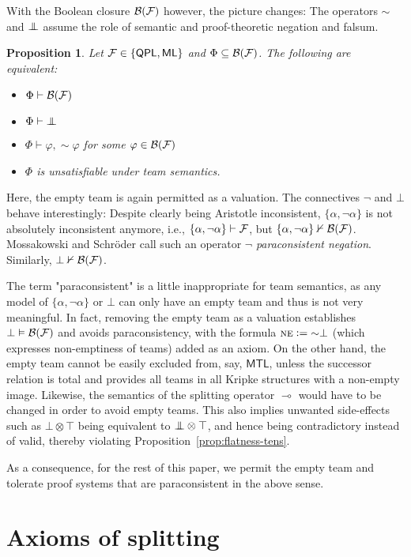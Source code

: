 \documentclass[a4paper,english,fleqn,11pt,final]{scrartcl}
\makeatletter
\newcommand{\ie}{i.e.\@\xspace}
\newcommand{\negg}{{\sim}}
\newcommand{\logic}[1]{\ensuremath{\mathsf{#1}}\xspace}
\newcommand{\QPL}{\logic{QPL}}
\newcommand{\ML}{\logic{ML}}
\newcommand{\MTL}{\logic{MTL}}
\newcommand{\NE}{\text{\textsc{ne}}}
\newcommand{\calB}{\protect\ensuremath{\mathcal{B}}}
\newcommand{\calF}{\protect\ensuremath{\mathcal{F}}}
\providecommand{\dfn}{\mathrel{\mathop:}=}
\newcommand{\limp}{\multimap}
\newcommand{\tens}{\otimes}
\newcommand{\falsum}{\mathrlap{\,\bot}\bot\,}
\theoremstyle{plain}
\newtheorem{proposition}[theorem]{Proposition}
\theoremstyle{definition}
\makeatother
\begin{document}
With the Boolean closure $\calB(\calF)$ however, the picture changes:
The operators $\negg$ and $\falsum$ assume the role of semantic and proof-theoretic negation and falsum.
\begin{proposition}
Let $\calF \in \{\QPL,\ML \}$ and $\Phi \subseteq \calB(\calF)$.
The following are equivalent:
\begin{itemize}
\item $\Phi \vdash \calB(\calF)$
\item $\Phi \vdash \falsum$
\item $\Phi \vdash \varphi,\negg\varphi$ for some $\varphi \in \calB(\calF)$
\item $\Phi$ is unsatisfiable under team semantics.
\end{itemize}
\end{proposition}

Here, the empty team is again permitted as a valuation.
The connectives $\neg$ and $\bot$ behave interestingly:
Despite clearly being Aristotle inconsistent, $\{\alpha,\neg\alpha\}$ is not 
absolutely inconsistent anymore, \ie, $\{\alpha,\neg\alpha\} \vdash \calF$, but $\{\alpha,\neg\alpha\} \nvdash \calB(\calF)$.
Mossakowski and Schröder call such an operator $\neg$  \emph{paraconsistent negation}.
Similarly, $\bot \nvdash \calB(\calF)$.

The term "paraconsistent" is a little inappropriate for team semantics, as any model of $\{\alpha,\neg\alpha\}$ or $\bot$ can only have an empty team and thus is not very meaningful.
In fact, removing the empty team as a valuation establishes $\bot \vDash \calB(\calF)$ and avoids paraconsistency,
with the formula $\NE \dfn \negg \bot$ (which expresses non-emptiness of teams) added as an axiom.
On the other hand, the empty team cannot be easily excluded from, say, $\MTL$, unless the successor relation is total and provides all teams in all Kripke structures with a non-empty image.
Likewise, the semantics of the splitting operator $\limp$ would have to be changed in order to avoid empty teams.
This also implies unwanted side-effects such as $\bot \tens \top$ being equivalent to $\falsum \tens \top$, and hence being contradictory instead of valid, thereby violating Proposition~\ref{prop:flatness-tens}.

As a consequence, for the rest of this paper, we permit the empty team and tolerate proof systems that are paraconsistent in the above sense.


  
\section{Axioms of splitting}
\end{document}

